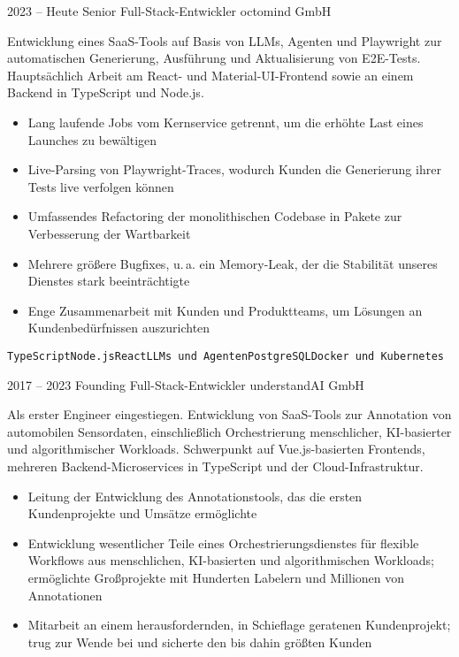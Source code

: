 \documentclass[8pt]{developercv} %
\newcommand{\linebreaksmall}{\vspace{2mm}}
\begin{document}
\begin{entrylist}
	\entry
		{2023 -- Heute}
		{Senior Full-Stack-Entwickler}
		{octomind GmbH}
		{Entwicklung eines SaaS-Tools auf Basis von LLMs, Agenten und Playwright zur automatischen Generierung, Ausführung und Aktualisierung von E2E-Tests. Hauptsächlich Arbeit am React- und Material-UI-Frontend sowie an einem Backend in TypeScript und Node.js.
		\begin{itemize}[nosep, topsep=0pt, left=5pt, after=\vspace{6pt}]
			\item Lang laufende Jobs vom Kernservice getrennt, um die erhöhte Last eines Launches zu bewältigen
			\item Live-Parsing von Playwright-Traces, wodurch Kunden die Generierung ihrer Tests live verfolgen können
			\item Umfassendes Refactoring der monolithischen Codebase in Pakete zur Verbesserung der Wartbarkeit
			\item Mehrere größere Bugfixes, u.\,a. ein Memory-Leak, der die Stabilität unseres Dienstes stark beeinträchtigte
			\item Enge Zusammenarbeit mit Kunden und Produktteams, um Lösungen an Kundenbedürfnissen auszurichten
		\end{itemize}
		\texttt{TypeScript}\slashsep\texttt{Node.js}\slashsep\texttt{React}\slashsep\texttt{LLMs und Agenten}\slashsep\texttt{PostgreSQL}\slashsep\texttt{Docker und Kubernetes}} \linebreaksmall
	\entry
		{2017 -- 2023}
		{Founding Full-Stack-Entwickler}
		{understandAI GmbH}
		{Als erster Engineer eingestiegen. Entwicklung von SaaS-Tools zur Annotation von automobilen Sensordaten, einschließlich Orchestrierung menschlicher, KI-basierter und algorithmischer Workloads. Schwerpunkt auf Vue.js-basierten Frontends, mehreren Backend-Microservices in TypeScript und der Cloud-Infrastruktur.
		\begin{itemize}[nosep, topsep=0pt, left=5pt, after=\vspace{6pt}]
			\item Leitung der Entwicklung des Annotationstools, das die ersten Kundenprojekte und Umsätze ermöglichte
			\item Entwicklung wesentlicher Teile eines Orchestrierungsdienstes für flexible Workflows aus menschlichen, KI-basierten und algorithmischen Workloads; ermöglichte Großprojekte mit Hunderten Labelern und Millionen von Annotationen
			\item Mitarbeit an einem herausfordernden, in Schieflage geratenen Kundenprojekt; trug zur Wende bei und sicherte den bis dahin größten Kunden

\end{itemize}}
\end{entrylist}
\end{document}
